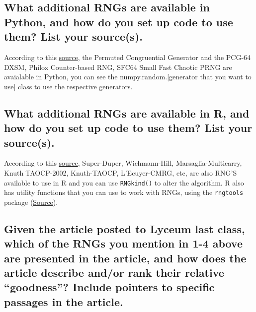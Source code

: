 \documentclass[
]{article}
\begin{document}
\hypertarget{what-additional-rngs-are-available-in-python-and-how-do-you-set-up-code-to-use-them-list-your-sources.}{%
\subsection{What additional RNGs are available in Python, and how do you
set up code to use them? List your
source(s).}\label{what-additional-rngs-are-available-in-python-and-how-do-you-set-up-code-to-use-them-list-your-sources.}}

According to this
\href{https://numpy.org/doc/stable/reference/random/bit_generators/mt19937.html}{source},
the Permuted Congruential Generator and the PCG-64 DXSM, Philox
Counter-based RNG, SFC64 Small Fast Chaotic PRNG are avaialable in
Python, you can see the numpy.random.{[}generator that you want to
use{]} class to use the respective generators.

\hypertarget{what-additional-rngs-are-available-in-r-and-how-do-you-set-up-code-to-use-them-list-your-sources.}{%
\subsection{What additional RNGs are available in R, and how do you set
up code to use them? List your
source(s).}\label{what-additional-rngs-are-available-in-r-and-how-do-you-set-up-code-to-use-them-list-your-sources.}}

According to this
\href{https://consultglp.com/wp-content/uploads/2016/12/r-techniques-in-generating-random-numbers.pdf}{source},
Super-Duper, Wichmann-Hill, Marsaglia-Multicarry, KnuthTAOCP-2002,
Knuth-TAOCP, L'Ecuyer-CMRG, etc, are also RNG'S available to use in R
and you can use \texttt{RNGkind()} to alter the algorithm. R also has
utility functions that you can use to work with RNGs, using the
\texttt{rngtools} package
(\href{https://renozao.github.io/rngtools/master/index.html}{Source}).

\hypertarget{given-the-article-posted-to-lyceum-last-class-which-of-the-rngs-you-mention-in-1-4-above-are-presented-in-the-article-and-how-does-the-article-describe-andor-rank-their-relative-goodness-include-pointers-to-specific-passages-in-the-article.}{%
\subsection{Given the article posted to Lyceum last class, which of the
RNGs you mention in 1-4 above are presented in the article, and how does
the article describe and/or rank their relative ``goodness''? Include
pointers to specific passages in the
article.}\label{given-the-article-posted-to-lyceum-last-class-which-of-the-rngs-you-mention-in-1-4-above-are-presented-in-the-article-and-how-does-the-article-describe-andor-rank-their-relative-goodness-include-pointers-to-specific-passages-in-the-article.}}
\end{document}
